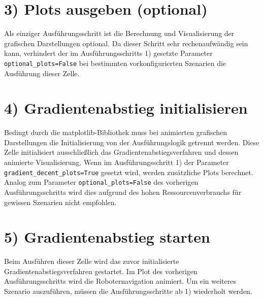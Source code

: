 \section*{3) Plots ausgeben (optional)}
Als einziger Ausführungsschritt ist die Berechnung und Visualisierung der grafischen Darstellungen optional. Da dieser Schritt sehr rechenaufwändig sein kann, verhindert der im Ausführungsschritts 1) gesetzte Parameter \texttt{optional\_plots=False} bei bestimmten vorkonfigurierten Szenarien die Ausführung dieser Zelle.

\section*{4) Gradientenabstieg initialisieren}
Bedingt durch die matplotlib-Bibliothek muss bei animierten grafischen Darstellungen die Initialisierung von der Ausführungslogik getrennt werden.
Diese Zelle initialisiert ausschließlich das Gradientenabstiegsverfahren und dessen animierte Visualisierung. Wenn im Ausführungsschritt 1) der Parameter \texttt{gradient\_decent\_plots=True} gesetzt wird, werden zusätzliche Plots berechnet. Analog zum Parameter \texttt{optional\_plots=False} des vorherigen Ausführungsschritts wird dies aufgrund des hohen Ressourcenverbrauchs für gewissen Szenarien nicht empfohlen.

\section*{5) Gradientenabstieg starten}
Beim Ausführen dieser Zelle wird das zuvor initialisierte Gradientenabstiegsverfahren gestartet. Im Plot des vorherigen Ausführungsschritts wird die Roboternavigation animiert.
Um ein weiteres Szenario auszuführen, müssen die Ausführungsschritte ab 1) wiederholt werden.


